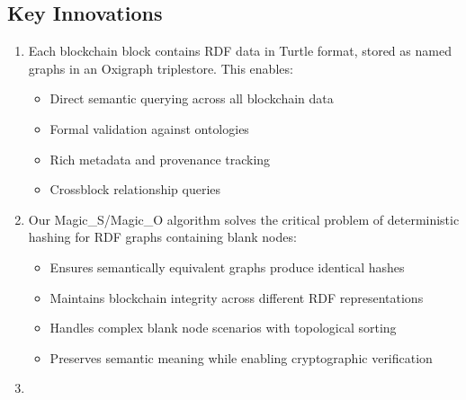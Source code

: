 \documentclass[letterpaper,10pt,english]{sphinxmanual}
\begin{document}
\subsection{Key Innovations}
\label{\detokenize{overview/index:key-innovations}}\begin{enumerate}
%
\item {} 
\sphinxAtStartPar
{}

\sphinxAtStartPar
Each blockchain block contains RDF data in Turtle format, stored as named graphs in an Oxigraph triplestore. This enables:
\begin{itemize}
\item {} 
\sphinxAtStartPar
Direct semantic querying across all blockchain data

\item {} 
\sphinxAtStartPar
Formal validation against ontologies

\item {} 
\sphinxAtStartPar
Rich metadata and provenance tracking

\item {} 
\sphinxAtStartPar
Cross\sphinxhyphen{}block relationship queries

\end{itemize}

\item {} 
\sphinxAtStartPar
{}

\sphinxAtStartPar
Our Magic\_S/Magic\_O algorithm solves the critical problem of deterministic hashing for RDF graphs containing blank nodes:
\begin{itemize}
\item {} 
\sphinxAtStartPar
Ensures semantically equivalent graphs produce identical hashes

\item {} 
\sphinxAtStartPar
Maintains blockchain integrity across different RDF representations

\item {} 
\sphinxAtStartPar
Handles complex blank node scenarios with topological sorting

\item {} 
\sphinxAtStartPar
Preserves semantic meaning while enabling cryptographic verification

\end{itemize}

\item {} 
\sphinxAtStartPar
{}


\end{enumerate}
\end{document}
